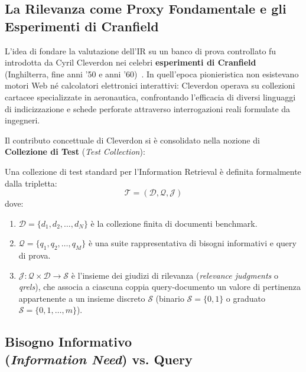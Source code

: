 \FloatBarrier
\subsection{La Rilevanza come Proxy Fondamentale e gli Esperimenti di Cranfield}
\label{subsec:cleverdon-cranfield}

L'idea di fondare la valutazione dell'IR su un banco di prova controllato fu introdotta da Cyril Cleverdon nei celebri \textbf{esperimenti di Cranfield} (Inghilterra, fine anni '50 e anni '60)~\cite{cleverdon1967}. 
In quell'epoca pionieristica non esistevano motori Web né calcolatori elettronici interattivi: Cleverdon operava su collezioni cartacee specializzate in aeronautica, confrontando l'efficacia di diversi linguaggi di indicizzazione e schede perforate attraverso interrogazioni reali formulate da ingegneri.

Il contributo concettuale di Cleverdon si \`e consolidato nella nozione di \textbf{Collezione di Test} (\textit{Test Collection}):

\begin{definition}
Una collezione di test standard per l'Information Retrieval \`e definita formalmente dalla tripletta:
\begin{equation}
\mathcal{T} = (\mathcal{D}, \mathcal{Q}, \mathcal{J})
\end{equation}
dove:
\begin{enumerate}
    \item $\mathcal{D} = \{d_1, d_2, \dots, d_N\}$ \`e la collezione finita di documenti benchmark.
    \item $\mathcal{Q} = \{q_1, q_2, \dots, q_M\}$ \`e una suite rappresentativa di bisogni informativi e query di prova.
    \item $\mathcal{J} \colon \mathcal{Q} \times \mathcal{D} \to \mathcal{S}$ \`e l'insieme dei giudizi di rilevanza (\textit{relevance judgments} o \textit{qrels}), che associa a ciascuna coppia query-documento un valore di pertinenza appartenente a un insieme discreto $\mathcal{S}$ (binario $\mathcal{S}=\{0, 1\}$ o graduato $\mathcal{S}=\{0, 1, \dots, m\}$).
\end{enumerate}
\end{definition}

\FloatBarrier
\subsection[Bisogno Informativo vs. Query]{Bisogno Informativo\\
(\textit{Information Need}) vs. Query}
\label{subsec:information-need-vs-query}

